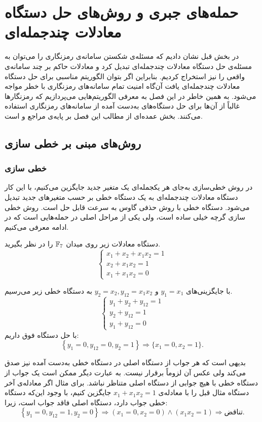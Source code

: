 \chapter{حمله‌های جبری و روش‌های حل دستگاه معادلات چندجمله‌ای}
در بخش قبل نشان دادیم که مسئله‌ی شکستن سامانه‌ی رمزنگاری را می‌توان به مسئله‌ی حل دستگاه معادلات چندجمله‌ای تبدیل کرد و معادلات حاکم بر چند سامانه‌ی واقعی را نیز استخراج کردیم. بنابراین اگر بتوان الگوریتم مناسبی برای حل دستگاه معادلات چندجمله‌ای یافت آن‌گاه امنیت تمام سامانه‌های رمزنگاری با خطر مواجه می‌شود. به همین خاطر در این فصل به معرفی الگوریتم‌هایی می‌پردازیم که رمزنگارها غالباً از آن‌ها برای حل دستگاه‌های به‌دست آمده از سامانه‌های رمزنگاری استفاده می‌کنند. بخش عمده‌ای از مطالب این فصل بر پایه‌ی مراجع 
\cite{bard2009algebraic, courtois2000efficient, cca2_kreuzer}
و
\cite{albrecht2010alorithmic, courtois2002cryptanalysis, ullah2012new}
است.



\section{روش‌های مبنی بر خطی سازی}
\subsection{خطی سازی}
در روش خطی‌سازی به‌جای هر یکجمله‌ای یک متغیر جدید جایگزین می‌کنیم، با این‌ کار دستگاه معادلات چندجمله‌ای به یک دستگاه خطی بر حسب متغیرهای جدید تبدیل می‌شود. دستگاه خطی با روش حذفی گاوس به سرعت قابل حل است. روش خطی سازی گرچه خیلی ساده است، ولی یکی از مراحل اصلی در حمله‌هایی است که در ادامه معرفی می‌کنیم. 
\begin{example}
دستگاه معادلات زیر روی میدان 
$\mathbb{F}_{7}$
را در نظر بگیرید. 
	$$\left \{ \begin{array}{l}
	x_{1}+x_{2}+x_{1}x_{2} = 1\\
	x_{2}+x_{1}x_{2} = 1\\
	x_{1}+x_{1}x_{2} = 0
	\end{array} \right.$$

با جایگزینی‌های 
$y_{1} = x_{1}$
و
$y_{2} = x_{2}, y_{12} =  x_{1}x_{2}$
به دستگاه خطی زیر می‌رسیم.
	$$\left \{ \begin{array}{l}
	y_{1}+y_{2}+y_{12} = 1\\
	y_{2}+y_{12} = 1\\
	y_{1}+y_{12} = 0
	\end{array} \right.$$
با حل دستگاه فوق داریم:
	$$\left\{ y_{1}=0,y_{12}=0,y_{2}=1 \right\} \Longrightarrow \{x_{1} = 0, x_{2} = 1\}.$$
\end{example}
بدیهی است که هر جواب از دستگاه اصلی در دستگاه خطی به‌دست  آمده نیز صدق می‌کند ولی عکس آن لزوماً برقرار نیست. به عبارت دیگر ممکن است یک جواب از دستگاه خطی با هیچ جوابی از دستگاه اصلی متناظر نباشد. برای مثال اگر معادله‌ی آخر دستگاه مثال قبل را با معادله‌ی 
$x_{1} + x_{1}x_{2} = 1$
جایگزین کنیم، با وجود این‌که دستگاه خطی جواب دارد، دستگاه اصلی  فاقد جواب است،  زیرا:
 $$ \left\{ y_{1}=0,y_{12}=1,y_{2}=0 \right\}  \Longrightarrow (x_{1} = 0, x_{2} = 0) \wedge (x_{1}x_{2} = 1) \Longrightarrow \text{تناقض}.$$
 
